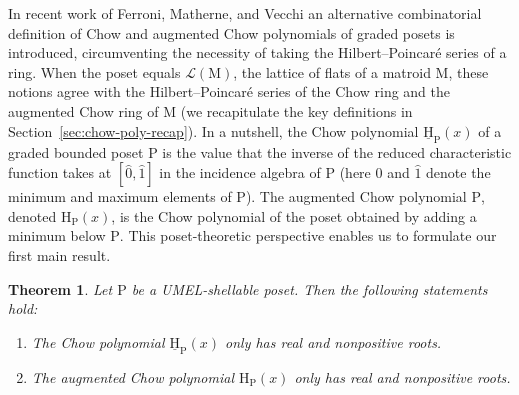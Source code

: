 \documentclass[11pt,a4paper]{amsart}
\theoremstyle{results}
\newtheorem{maintheorem}[thm]{Theorem}
\theoremstyle{definitions}
\def\P{\mathbb{P}}
\newcommand{\uH}{\underline{\mathrm{H}}}
\newcommand{\M}{\mathrm{M}}
\renewcommand{\P}{\mathrm{P}}
\renewcommand{\H}{\mathrm{H}}
\begin{document}
In recent work of Ferroni, Matherne, and Vecchi \cite{ferroni-matherne-vecchi} an alternative combinatorial definition of Chow and augmented Chow polynomials of graded posets is introduced, circumventing the necessity of taking the Hilbert--Poincar\'e series of a ring. When the poset equals $\mathcal{L}(\M)$, the lattice of flats of a matroid $\M$, these notions agree with the Hilbert--Poincar\'e series of the Chow ring and the augmented Chow ring of $\M$ (we recapitulate the key definitions in Section~\ref{sec:chow-poly-recap}). In a nutshell, the Chow polynomial $\uH_\P(x)$ of a graded bounded poset $\P$ is the value that the inverse of the reduced characteristic function takes at $[\widehat{0},\widehat{1}]$ in the incidence algebra of $\P$ (here $\widehat{0}$ and $\widehat{1}$ denote the minimum and maximum elements of $\P$). The augmented Chow polynomial $\P$, denoted $\H_\P(x)$, is the Chow polynomial of the poset obtained by adding a minimum below $\P$. This poset-theoretic perspective enables us to formulate our first main result.
\begin{maintheorem}
\label{thm:main1-intro}
     Let $\P$ be a UMEL-shellable poset. 
    Then the following statements hold: 
    \begin{enumerate}[\normalfont (i)]
        \item The Chow polynomial $\uH_{\P}(x)$ only has real and nonpositive roots. 
        \item The augmented Chow polynomial $\H_{\P}(x)$ only has real and nonpositive roots. 
    \end{enumerate}
\end{maintheorem}
\end{document}
